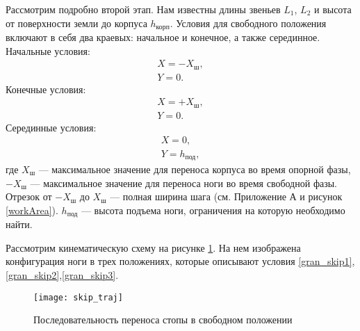 Рассмотрим подробно второй этап. Нам известны длины звеньев $L_{1}$, $L_{2}$ и высота от поверхности земли до корпуса $h_{\text{корп}}$. 
Условия для свободного положения включают в себя два краевых: начальное и конечное, а также серединное.
\newline
Начальные условия:
\begin{equation}
	\begin{array}{l}
		X = -X_{\text{ш}},
		\\
		Y = 0.
	\label{gran_skip1}
	\end{array}
\end{equation}
Конечные условия:
\begin{equation}
	\begin{array}{l}
		X = +X_{\text{ш}},
		\\
		Y = 0.
	\label{gran_skip2}
	\end{array}
\end{equation}
Серединные условия:
\begin{equation}
	\begin{array}{l}
		X = 0,
		\\
		Y = h_{\text{под}},
	\end{array}
	\label{gran_skip3}
\end{equation}
где $X_{\text{ш}}$ --- максимальное значение для переноса корпуса во время опорной фазы, $-$$X_{\text{ш}}$ --- максимальное значение для переноса ноги во время свободной фазы. Отрезок от $-$$X_{\text{ш}}$ до $X_{\text{ш}}$ --- полная ширина шага (см. Приложение А и рисунок \ref{workArea}). $h_{\text{под}}$ --- высота подъема ноги, ограничения на которую необходимо найти.

Рассмотрим кинематическую схему на рисунке \ref{skip_traj}. На нем изображена конфигурация ноги в трех положениях, которые описывают условия \ref{gran_skip1},\ref{gran_skip2},\ref{gran_skip3}. 
\newpage
\begin{figure}[h!]
	\begin{center}
		\texttt{[image: skip\_traj]}
		\caption{Последовательность переноса стопы в свободном положении}
		\label{skip_traj}
	\end{center}
\end{figure}

